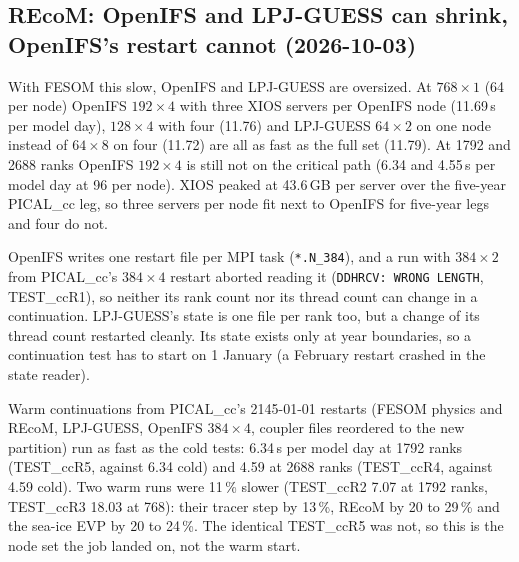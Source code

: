 \documentclass[11pt,a4paper]{article}
\begin{document}
\subsection{REcoM: OpenIFS and LPJ-GUESS can shrink, OpenIFS's restart cannot (2026-10-03)}
With FESOM this slow, OpenIFS and LPJ-GUESS are oversized. At $768\times1$ (64 per node) OpenIFS $192\times4$ with three XIOS servers per OpenIFS node (11.69\,s per model day), $128\times4$ with four (11.76) and LPJ-GUESS $64\times2$ on one node instead of $64\times8$ on four (11.72) are all as fast as the full set (11.79). At 1792 and 2688 ranks OpenIFS $192\times4$ is still not on the critical path (6.34 and 4.55\,s per model day at 96 per node). XIOS peaked at 43.6\,GB per server over the five-year PICAL\_cc leg, so three servers per node fit next to OpenIFS for five-year legs and four do not.

OpenIFS writes one restart file per MPI task (\texttt{*.N\_384}), and a run with $384\times2$ from PICAL\_cc's $384\times4$ restart aborted reading it (\texttt{DDHRCV: WRONG LENGTH}, TEST\_ccR1), so neither its rank count nor its thread count can change in a continuation. LPJ-GUESS's state is one file per rank too, but a change of its thread count restarted cleanly. Its state exists only at year boundaries, so a continuation test has to start on 1 January (a February restart crashed in the state reader).

Warm continuations from PICAL\_cc's 2145-01-01 restarts (FESOM physics and REcoM, LPJ-GUESS, OpenIFS $384\times4$, coupler files reordered to the new partition) run as fast as the cold tests: 6.34\,s per model day at 1792 ranks (TEST\_ccR5, against 6.34 cold) and 4.59 at 2688 ranks (TEST\_ccR4, against 4.59 cold). Two warm runs were 11\,\% slower (TEST\_ccR2 7.07 at 1792 ranks, TEST\_ccR3 18.03 at 768): their tracer step by 13\,\%, REcoM by 20 to 29\,\% and the sea-ice EVP by 20 to 24\,\%. The identical TEST\_ccR5 was not, so this is the node set the job landed on, not the warm start.
\end{document}
